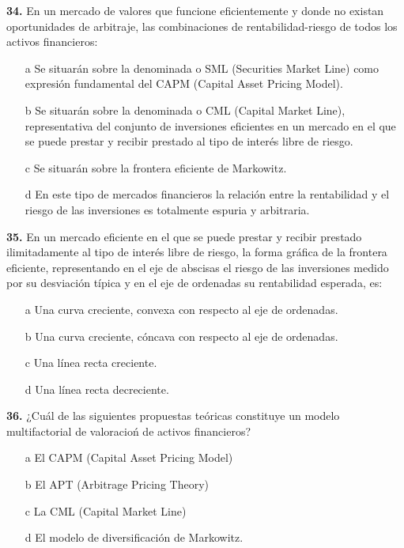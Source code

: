 \documentclass{nuevotema}
\begin{document}
\textbf{34.} En un mercado de valores que funcione eficientemente y donde no existan oportunidades de arbitraje, las combinaciones de rentabilidad-riesgo de todos los activos financieros:
\begin{enumerate}
	\item[a] Se situarán sobre la denominada  o SML (Securities Market Line) como expresión fundamental del CAPM (Capital Asset Pricing Model).
	\item[b] Se situarán sobre la denominada  o CML (Capital Market Line), representativa del conjunto de inversiones eficientes en un mercado en el que se puede prestar y recibir prestado al tipo de interés libre de riesgo.
	\item[c] Se situarán sobre la frontera eficiente de Markowitz.
	\item[d] En este tipo de mercados financieros la relación entre la rentabilidad y el riesgo de las inversiones es totalmente espuria y arbitraria.
\end{enumerate}

\textbf{35.} En un mercado eficiente en el que se puede prestar y recibir prestado ilimitadamente al tipo de interés libre de riesgo, la forma gráfica de la frontera eficiente, representando en el eje de abscisas el riesgo de las inversiones medido por su desviación típica y en el eje de ordenadas su rentabilidad esperada, es:
\begin{enumerate}
	\item[a] Una curva creciente, convexa con respecto al eje de ordenadas.
	\item[b] Una curva creciente, cóncava con respecto al eje de ordenadas.
	\item[c] Una línea recta creciente.
	\item[d] Una línea recta decreciente.
\end{enumerate}

\textbf{36.} ¿Cuál de las siguientes propuestas teóricas constituye un modelo multifactorial de valoracioń de activos financieros?
\begin{enumerate}
	\item[a] El CAPM (Capital Asset Pricing Model)
	\item[b] El APT (Arbitrage Pricing Theory)
	\item[c] La CML (Capital Market Line)
	\item[d] El modelo de diversificación de Markowitz.
\end{enumerate}
\end{document}
